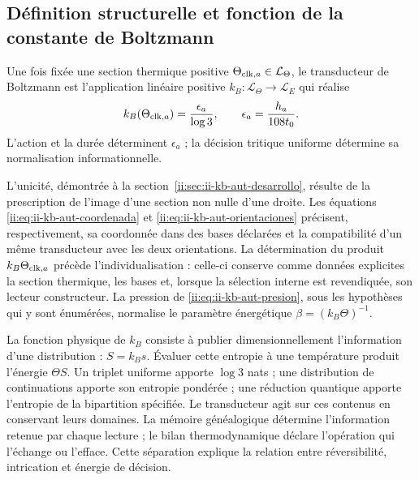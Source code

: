 \subsection{Définition structurelle et fonction de la constante de Boltzmann}
\label{ii:sec:ii-definicion-boltzmann}

\begin{definition}
Une fois fixée une section thermique positive
\(\Theta_{{\rm clk},a}\in\mathcal L_\Theta\), le transducteur
de Boltzmann est l'application linéaire positive
\(k_B:\mathcal L_\Theta\to\mathcal L_E\) qui réalise
\begin{equation}
 k_B(\Theta_{{\rm clk},a})
 =\frac{\epsilon_a}{\log3},
 \qquad \epsilon_a=\frac{h_a}{108t_0}.
 \label{ii:eq:ii-definicion-boltzmann-transductor}
\end{equation}
L'action et la durée déterminent \(\epsilon_a\) ; la décision
tritique uniforme détermine sa normalisation informationnelle.
\end{definition}

L'unicité, démontrée à la section~\ref{ii:sec:ii-kb-aut-desarrollo},
résulte de la prescription de l'image d'une section non nulle d'une droite.
Les équations \eqref{ii:eq:ii-kb-aut-coordenada} et
\eqref{ii:eq:ii-kb-aut-orientaciones} précisent, respectivement, sa
coordonnée dans des bases déclarées et la compatibilité d'un même
transducteur avec les deux orientations. La détermination du produit
\(k_B\Theta_{{\rm clk},a}\) précède l'individualisation :
celle-ci conserve comme données explicites la section thermique, les
bases et, lorsque la sélection interne est revendiquée, son lecteur constructeur.
La pression de \eqref{ii:eq:ii-kb-aut-presion}, sous les hypothèses
qui y sont énumérées, normalise le paramètre énergétique
\(\beta=(k_B\Theta)^{-1}\).

La fonction physique de \(k_B\) consiste à publier dimensionnellement
l'information d'une distribution : \(S=k_Bs\). Évaluer cette
entropie à une température produit l'énergie \(\Theta S\).
Un triplet uniforme apporte \(\log3\) nats ; une distribution de
continuations apporte son entropie pondérée ; une réduction quantique
apporte l'entropie de la bipartition spécifiée. Le transducteur
agit sur ces contenus en conservant leurs domaines. La mémoire
généalogique détermine l'information retenue par chaque lecture ; le
bilan thermodynamique déclare l'opération qui l'échange ou
l'efface. Cette séparation explique la relation entre réversibilité,
intrication et énergie de décision.
